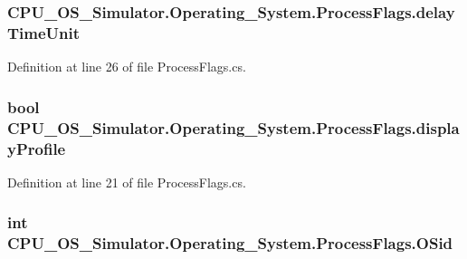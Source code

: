 \subsubsection[{delay\+Time\+Unit}]{ C\+P\+U\+\_\+\+O\+S\+\_\+\+Simulator.\+Operating\+\_\+\+System.\+Process\+Flags.\+delay\+Time\+Unit}\label{struct_c_p_u___o_s___simulator_1_1_operating___system_1_1_process_flags_a0e5e535ff000e1b630180443c2295776}


Definition at line 26 of file Process\+Flags.\+cs.

\hypertarget{struct_c_p_u___o_s___simulator_1_1_operating___system_1_1_process_flags_a8290519886f3517f690f3acba8330440}{}
\subsubsection[{display\+Profile}]{\setlength{\rightskip}{0pt plus 5cm}bool C\+P\+U\+\_\+\+O\+S\+\_\+\+Simulator.\+Operating\+\_\+\+System.\+Process\+Flags.\+display\+Profile}\label{struct_c_p_u___o_s___simulator_1_1_operating___system_1_1_process_flags_a8290519886f3517f690f3acba8330440}


Definition at line 21 of file Process\+Flags.\+cs.

\hypertarget{struct_c_p_u___o_s___simulator_1_1_operating___system_1_1_process_flags_a819f86c160d64c6f4cbba56418cb688e}{}
\subsubsection[{O\+Sid}]{\setlength{\rightskip}{0pt plus 5cm}int C\+P\+U\+\_\+\+O\+S\+\_\+\+Simulator.\+Operating\+\_\+\+System.\+Process\+Flags.\+O\+Sid}\label{struct_c_p_u___o_s___simulator_1_1_operating___system_1_1_process_flags_a819f86c160d64c6f4cbba56418cb688e}


